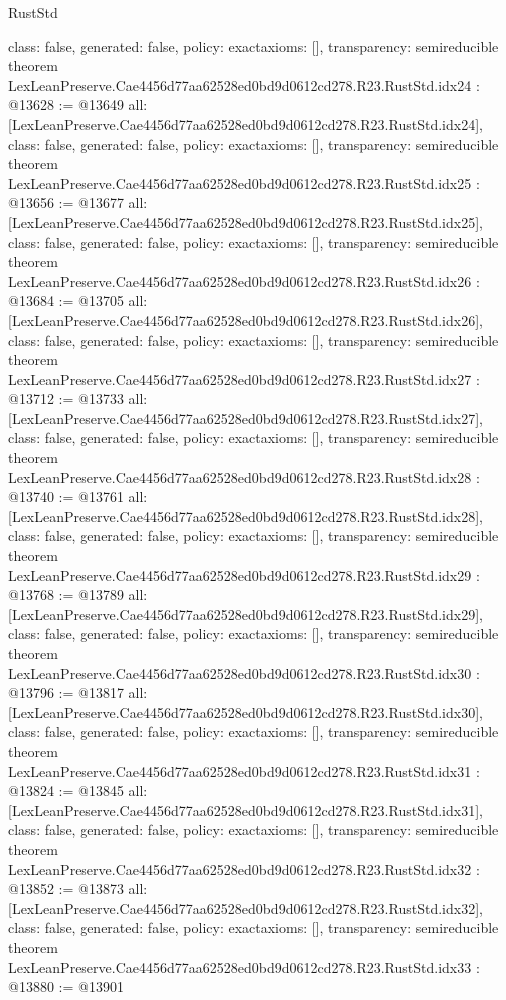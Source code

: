 \begin{lexlean}{RustStd}
\begin{coremodule}
{  class: false,
  generated: false,
  policy: exact{axioms: []},
  transparency: semireducible
}
theorem LexLeanPreserve.Cae4456d77aa62528ed0bd9d0612cd278.R23.RustStd.idx24 : @13628 := @13649 {
  all: [LexLeanPreserve.Cae4456d77aa62528ed0bd9d0612cd278.R23.RustStd.idx24],
  class: false,
  generated: false,
  policy: exact{axioms: []},
  transparency: semireducible
}
theorem LexLeanPreserve.Cae4456d77aa62528ed0bd9d0612cd278.R23.RustStd.idx25 : @13656 := @13677 {
  all: [LexLeanPreserve.Cae4456d77aa62528ed0bd9d0612cd278.R23.RustStd.idx25],
  class: false,
  generated: false,
  policy: exact{axioms: []},
  transparency: semireducible
}
theorem LexLeanPreserve.Cae4456d77aa62528ed0bd9d0612cd278.R23.RustStd.idx26 : @13684 := @13705 {
  all: [LexLeanPreserve.Cae4456d77aa62528ed0bd9d0612cd278.R23.RustStd.idx26],
  class: false,
  generated: false,
  policy: exact{axioms: []},
  transparency: semireducible
}
theorem LexLeanPreserve.Cae4456d77aa62528ed0bd9d0612cd278.R23.RustStd.idx27 : @13712 := @13733 {
  all: [LexLeanPreserve.Cae4456d77aa62528ed0bd9d0612cd278.R23.RustStd.idx27],
  class: false,
  generated: false,
  policy: exact{axioms: []},
  transparency: semireducible
}
theorem LexLeanPreserve.Cae4456d77aa62528ed0bd9d0612cd278.R23.RustStd.idx28 : @13740 := @13761 {
  all: [LexLeanPreserve.Cae4456d77aa62528ed0bd9d0612cd278.R23.RustStd.idx28],
  class: false,
  generated: false,
  policy: exact{axioms: []},
  transparency: semireducible
}
theorem LexLeanPreserve.Cae4456d77aa62528ed0bd9d0612cd278.R23.RustStd.idx29 : @13768 := @13789 {
  all: [LexLeanPreserve.Cae4456d77aa62528ed0bd9d0612cd278.R23.RustStd.idx29],
  class: false,
  generated: false,
  policy: exact{axioms: []},
  transparency: semireducible
}
theorem LexLeanPreserve.Cae4456d77aa62528ed0bd9d0612cd278.R23.RustStd.idx30 : @13796 := @13817 {
  all: [LexLeanPreserve.Cae4456d77aa62528ed0bd9d0612cd278.R23.RustStd.idx30],
  class: false,
  generated: false,
  policy: exact{axioms: []},
  transparency: semireducible
}
theorem LexLeanPreserve.Cae4456d77aa62528ed0bd9d0612cd278.R23.RustStd.idx31 : @13824 := @13845 {
  all: [LexLeanPreserve.Cae4456d77aa62528ed0bd9d0612cd278.R23.RustStd.idx31],
  class: false,
  generated: false,
  policy: exact{axioms: []},
  transparency: semireducible
}
theorem LexLeanPreserve.Cae4456d77aa62528ed0bd9d0612cd278.R23.RustStd.idx32 : @13852 := @13873 {
  all: [LexLeanPreserve.Cae4456d77aa62528ed0bd9d0612cd278.R23.RustStd.idx32],
  class: false,
  generated: false,
  policy: exact{axioms: []},
  transparency: semireducible
}
theorem LexLeanPreserve.Cae4456d77aa62528ed0bd9d0612cd278.R23.RustStd.idx33 : @13880 := @13901 {
}
\end{coremodule}
\end{lexlean}
